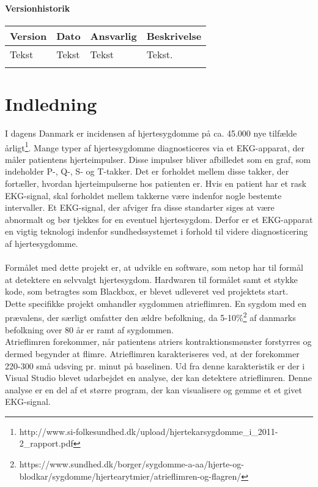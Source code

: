 \subsubsection{Versionhistorik}

\begin{longtabu} to 
    Version &    Dato &    Ansvarlig &    Beskrivelse\\[-1ex]
    \midrule
    Tekst &    Tekst &    Tekst &    Tekst.\\
\label{version_Systemark}
\end{longtabu}

\chapter{Indledning}
I dagens Danmark er incidensen af hjertesygdomme på ca. 45.000 nye tilfælde årligt\footnote{http://www.si-folkesundhed.dk/upload/hjertekarsygdomme\_i\_2011-2\_rapport.pdf}. Mange typer af hjertesygdomme diagnosticeres via et EKG-apparat, der måler patientens hjerteimpulser. Disse impulser bliver afbilledet som en graf, som indeholder P-, Q-, S- og T-takker. Det er forholdet mellem disse takker, der fortæller, hvordan hjerteimpulserne hos patienten er. Hvis en patient har et rask EKG-signal, skal forholdet mellem takkerne være indenfor nogle bestemte intervaller. Et EKG-signal, der afviger fra disse standarter siges at være abnormalt og bør tjekkes for en eventuel hjertesygdom. Derfor er et EKG-apparat en vigtig teknologi indenfor sundhedssystemet i forhold til videre diagnosticering af hjertesygdomme.\\ \\
Formålet med dette projekt er, at udvikle en software, som netop har til formål at detektere en selvvalgt hjertesygdom. Hardwaren til formålet samt et stykke kode, som betragtes som Blackbox, er blevet udleveret ved projektets start.\\
Dette specifikke projekt omhandler sygdommen atrieflimren. En sygdom med en  prævalens, der særligt omfatter den ældre befolkning, da 5-10\%\footnote{https://www.sundhed.dk/borger/sygdomme-a-aa/hjerte-og-blodkar/sygdomme/hjertearytmier/atrieflimren-og-flagren/} af danmarks befolkning over 80 år er ramt af sygdommen.\\
Atrieflimren forekommer, når patientens atriers kontraktionsmønster forstyrres og dermed begynder at flimre. Atrieflimren karakteriseres ved, at der forekommer 220-300 små udsving pr. minut på baselinen. Ud fra denne karakteristik er der i Visual Studio blevet udarbejdet en analyse, der kan detektere atrieflimren. Denne analyse er en del af et større program, der kan visualisere og gemme et et givet EKG-signal.   

  

